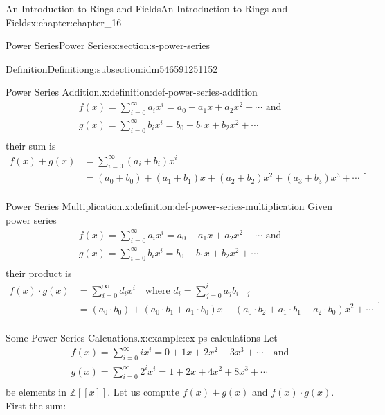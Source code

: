 \documentclass[oneside,10pt,]{book}
\numberwithin{equation}{section}
\begin{document}
\begin{chapterptx}{An Introduction to Rings and Fields}{}{An Introduction to Rings and Fields}{}{}{x:chapter:chapter_16}
\begin{sectionptx}{Power Series}{}{Power Series}{}{}{x:section:s-power-series}
\begin{subsectionptx}{Definition}{}{Definition}{}{}{g:subsection:idm546591251152}
\begin{definition}{Power Series Addition.}{x:definition:def-power-series-addition}
\begin{equation*}
\begin{array}{c}
f(x)=\sum_{i=0}^{\infty } a_i x^i=a_0 + a_1 x+a_2 x^2+ \cdots\textrm{  and}\\
g(x)=\sum_{i=0}^{\infty } b_i x^i=b_0 + b_1 x+b_2 x^2+ \cdots\\
\end{array}
\end{equation*}
their sum is%
\begin{equation*}
\begin{split}
f(x)+g(x)&=\sum_{i=0}^{\infty }\left(a_i+b_i\right) x^i\\
&=(a_0 +b_0) + (a_1+b_1) x+(a_2+b_2) x^2+(a_3+b_3) x^3+ \cdots \\
\end{split}\text{.}
\end{equation*}
%
\end{definition}
\begin{definition}{Power Series Multiplication.}{x:definition:def-power-series-multiplication}%
Given power series%
\begin{equation*}
\begin{array}{c}
f(x)=\sum_{i=0}^{\infty } a_i x^i=a_0 + a_1 x+a_2 x^2+ \cdots\textrm{  and}\\
g(x)=\sum_{i=0}^{\infty } b_i x^i=b_0 + b_1 x+b_2 x^2+ \cdots\\
\end{array}
\end{equation*}
their product is%
\begin{equation*}
\begin{split}
f(x)\cdot g(x)&=\sum_{i=0}^{\infty } d_i x^i \quad \textrm{where }d_i= \sum_{j=0}^i a_j b_{i-j}\\
&=(a_0\cdot b_0) + (a_0\cdot b_1+a_1\cdot b_0) x+(a_0\cdot b_2+a_1\cdot b_1+a_2\cdot b_0) x^2+ \cdots  \\
\end{split}\text{.}
\end{equation*}
%
\end{definition}
\begin{example}{Some Power Series Calcuations.}{x:example:ex-ps-calculations}%
Let%
\begin{equation*}
\begin{array}{c}
f(x)=\sum_{i=0}^{\infty}  i x^i=0 + 1 x+2 x^2+3x^3+ \cdots \quad \textrm{and}\\
g(x)=\sum_{i=0}^{\infty} 2^i x^i=1 +2 x+4 x^2+8x^3+ \cdots \\
\end{array}
\end{equation*}
be elements in \(\mathbb{Z}[[x]]\).  Let us compute \(f(x) + g(x)\) and \(f(x)\cdot g(x)\).  First the sum:%

\end{example}
\end{subsectionptx}
\end{sectionptx}
\end{chapterptx}
\end{document}
